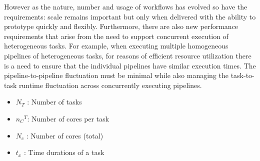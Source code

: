 However as the nature, number and usage of workflows has evolved so have the
requirements: scale remains important but only when delivered with the ability
to prototype quickly and flexibly. Furthermore, there are also new performance
requirements that arise from the need to support concurrent execution of
heterogeneous tasks. For example, when executing multiple homogeneous
pipelines of heterogeneous tasks, for reasons of efficient resource
utilization there is a need to ensure that the individual pipelines have
similar execution times. The pipeline-to-pipeline fluctuation must be minimal
while also managing the task-to-task runtime fluctuation across concurrently
executing pipelines.

\begin{itemize}
	\item $N_T$ : Number of tasks
	\item ${{n_C}^T}$: Number of cores per task
	\item $N_c$	: Number of cores (total)
	\item $t_x$ : Time durations of a task
\end{itemize}






